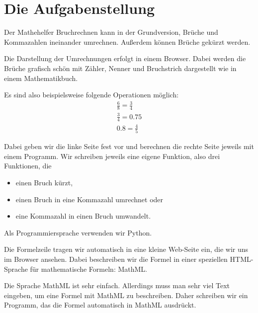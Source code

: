 \section{Die Aufgabenstellung}

Der Mathehelfer Bruchrechnen kann in der Grundversion, Brüche und Kommazahlen ineinander umrechnen. Außerdem können Brüche gekürzt werden.

Die Darstellung der Umrechnungen erfolgt in einem Browser. Dabei werden die Brüche grafisch schön mit Zähler, Nenner und Bruchstrich dargestellt wie in einem Mathematikbuch.

Es sind also beispielsweise folgende Operationen möglich:
\begin{align*}
& \frac{6}{8} = \frac{3}{4} & \\[2ex]
& \frac{3}{4} = 0.75 & \\[2ex]
& 0.8 = \frac{4}{5} & 
\end{align*}


Dabei geben wir die linke Seite fest vor und berechnen die rechte Seite jeweils mit einem Programm. Wir schreiben jeweils eine eigene Funktion, also drei Funktionen, die

\begin{itemize}
	\item einen Bruch kürzt,
	\item einen Bruch in eine Kommazahl umrechnet oder 
	\item eine Kommazahl in einen Bruch umwandelt.
\end{itemize}

Als Programmiersprache verwenden wir Python.

Die Formelzeile tragen wir automatisch in eine kleine Web-Seite ein, die wir uns im Browser ansehen. Dabei beschreiben wir die Formel in einer speziellen HTML-Sprache für mathematische Formeln: MathML.

Die Sprache MathML ist sehr einfach. Allerdings muss man sehr viel Text eingeben, um eine Formel mit MathML zu beschreiben. Daher schreiben wir ein Programm, das die Formel automatisch in MathML ausdrückt.